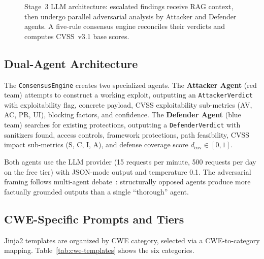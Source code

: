 \begin{figure}[H]
{%
}
\caption{Stage~3 LLM architecture: escalated findings receive RAG context, then undergo parallel adversarial analysis by Attacker and Defender agents. A five-rule consensus engine reconciles their verdicts and computes CVSS~v3.1 base scores.}
\label{fig:llm-arch}
\end{figure}

\subsection{Dual-Agent Architecture}

The \texttt{ConsensusEngine} creates two specialized agents. The \textbf{Attacker Agent} (red team) attempts to construct a working exploit, outputting an \texttt{AttackerVerdict} with exploitability flag, concrete payload, CVSS exploitability sub-metrics (AV, AC, PR, UI), blocking factors, and confidence. The \textbf{Defender Agent} (blue team) searches for existing protections, outputting a \texttt{DefenderVerdict} with sanitizers found, access controls, framework protections, path feasibility, CVSS impact sub-metrics (S, C, I, A), and defense coverage score $d_{\text{cov}} \in [0, 1]$.

Both agents use the LLM provider (15 requests per minute, 500 requests per day on the free tier) with JSON-mode output and temperature 0.1. The adversarial framing follows multi-agent debate~\cite{divergentthinking2023}: structurally opposed agents produce more factually grounded outputs than a single ``thorough'' agent.

\subsection{CWE-Specific Prompts and Tiers}

Jinja2 templates are organized by CWE category, selected via a CWE-to-category mapping. Table~\ref{tab:cwe-templates} shows the six categories.

